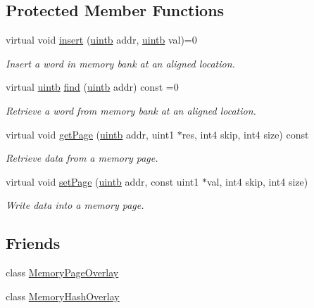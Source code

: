 \subsection*{Protected Member Functions}
\begin{DoxyCompactItemize}
\item 
virtual void \mbox{\hyperlink{class_memory_bank_abccbb8ba1e2c2ae941b372e90f454e5f}{insert}} (\mbox{\hyperlink{types_8h_a2db313c5d32a12b01d26ac9b3bca178f}{uintb}} addr, \mbox{\hyperlink{types_8h_a2db313c5d32a12b01d26ac9b3bca178f}{uintb}} val)=0
\begin{DoxyCompactList}\small\item\em Insert a word in memory bank at an aligned location. \end{DoxyCompactList}\item 
virtual \mbox{\hyperlink{types_8h_a2db313c5d32a12b01d26ac9b3bca178f}{uintb}} \mbox{\hyperlink{class_memory_bank_a421a5b8dd872d0c3e462d9055fa4266d}{find}} (\mbox{\hyperlink{types_8h_a2db313c5d32a12b01d26ac9b3bca178f}{uintb}} addr) const =0
\begin{DoxyCompactList}\small\item\em Retrieve a word from memory bank at an aligned location. \end{DoxyCompactList}\item 
virtual void \mbox{\hyperlink{class_memory_bank_ac48e5c77befa62116190b34611ad4339}{get\+Page}} (\mbox{\hyperlink{types_8h_a2db313c5d32a12b01d26ac9b3bca178f}{uintb}} addr, uint1 $\ast$res, int4 skip, int4 size) const
\begin{DoxyCompactList}\small\item\em Retrieve data from a memory {\itshape page}. \end{DoxyCompactList}\item 
virtual void \mbox{\hyperlink{class_memory_bank_a68bf2318442e1f7da99ae85f63f9df19}{set\+Page}} (\mbox{\hyperlink{types_8h_a2db313c5d32a12b01d26ac9b3bca178f}{uintb}} addr, const uint1 $\ast$val, int4 skip, int4 size)
\begin{DoxyCompactList}\small\item\em Write data into a memory page. \end{DoxyCompactList}\end{DoxyCompactItemize}
\subsection*{Friends}
\begin{DoxyCompactItemize}
\item 
class \mbox{\hyperlink{class_memory_bank_abfa1478e94e6c9f59f450ea1a3394466}{Memory\+Page\+Overlay}}
\item 
class \mbox{\hyperlink{class_memory_bank_aaef831bed4bde79676024649093dec95}{Memory\+Hash\+Overlay}}
\end{DoxyCompactItemize}


